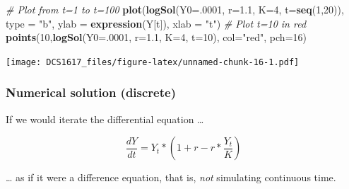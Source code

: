 \documentclass[]{book}
\newenvironment{Shaded}{\begin{snugshade}}{\end{snugshade}}
\newcommand{\KeywordTok}[1]{\textcolor[rgb]{0.13,0.29,0.53}{\textbf{{#1}}}}
\newcommand{\DataTypeTok}[1]{\textcolor[rgb]{0.13,0.29,0.53}{{#1}}}
\newcommand{\DecValTok}[1]{\textcolor[rgb]{0.00,0.00,0.81}{{#1}}}
\newcommand{\FloatTok}[1]{\textcolor[rgb]{0.00,0.00,0.81}{{#1}}}
\newcommand{\StringTok}[1]{\textcolor[rgb]{0.31,0.60,0.02}{{#1}}}
\newcommand{\CommentTok}[1]{\textcolor[rgb]{0.56,0.35,0.01}{\textit{{#1}}}}
\newcommand{\NormalTok}[1]{{#1}}
\begin{document}
\begin{Shaded}
\begin{Highlighting}[]
\CommentTok{# Plot from t=1 to t=100}
\KeywordTok{plot}\NormalTok{(}\KeywordTok{logSol}\NormalTok{(}\DataTypeTok{Y0=}\NormalTok{.}\DecValTok{0001}\NormalTok{, }\DataTypeTok{r=}\FloatTok{1.1}\NormalTok{, }\DataTypeTok{K=}\DecValTok{4}\NormalTok{, }\DataTypeTok{t=}\KeywordTok{seq}\NormalTok{(}\DecValTok{1}\NormalTok{,}\DecValTok{20}\NormalTok{)), }\DataTypeTok{type =} \StringTok{"b"}\NormalTok{, }
     \DataTypeTok{ylab =} \KeywordTok{expression}\NormalTok{(Y[t]), }\DataTypeTok{xlab =} \StringTok{"t"}\NormalTok{)}
\CommentTok{# Plot t=10 in red}
\KeywordTok{points}\NormalTok{(}\DecValTok{10}\NormalTok{,}\KeywordTok{logSol}\NormalTok{(}\DataTypeTok{Y0=}\NormalTok{.}\DecValTok{0001}\NormalTok{, }\DataTypeTok{r=}\FloatTok{1.1}\NormalTok{, }\DataTypeTok{K=}\DecValTok{4}\NormalTok{, }\DataTypeTok{t=}\DecValTok{10}\NormalTok{), }\DataTypeTok{col=}\StringTok{"red"}\NormalTok{, }\DataTypeTok{pch=}\DecValTok{16}\NormalTok{)}
\end{Highlighting}
\end{Shaded}

\texttt{[image: DCS1617\_files/figure-latex/unnamed-chunk-16-1.pdf]}

\subsubsection*{Numerical solution
(discrete)}\label{numerical-solution-discrete}

If we would iterate the differential equation \ldots{}

\[
\frac{dY}{dt} = Y_t * (1 + r - r * \frac{Y_t}{K})
\]

\ldots{} as if it were a difference equation, that is, \emph{not}
simulating continuous time.
\end{document}
